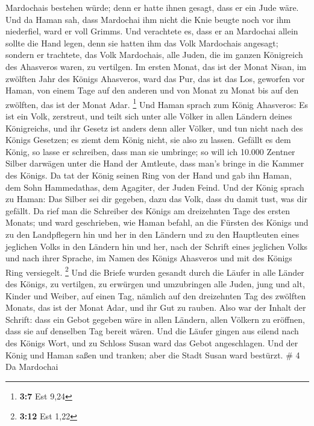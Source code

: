 Mardochais bestehen würde; denn er hatte ihnen gesagt, dass er ein Jude
wäre.  Und da Haman sah, dass Mardochai ihm nicht die Knie
beugte noch vor ihm niederfiel, ward er voll Grimms.  Und
verachtete es, dass er an Mardochai allein sollte die Hand legen, denn
sie hatten ihm das Volk Mardochais angesagt; sondern er trachtete, das
Volk Mardochais, alle Juden, die im ganzen Königreich des Ahasveros
waren, zu vertilgen.  Im ersten Monat, das ist der Monat
Nisan, im zwölften Jahr des Königs Ahasveros, ward das Pur, das ist das
Los, geworfen vor Haman, von einem Tage auf den anderen und von Monat zu
Monat bis auf den zwölften, das ist der Monat Adar. \footnote{\textbf{3:7}
  Est 9,24}  Und Haman sprach zum König Ahasveros: Es ist
ein Volk, zerstreut, und teilt sich unter alle Völker in allen Ländern
deines Königreichs, und ihr Gesetz ist anders denn aller Völker, und tun
nicht nach des Königs Gesetzen; es ziemt dem König nicht, sie also zu
lassen.  Gefällt es dem König, so lasse er schreiben, dass
man sie umbringe; so will ich 10.000 Zentner Silber darwägen unter die
Hand der Amtleute, dass man's bringe in die Kammer des Königs.
 Da tat der König seinen Ring von der Hand und gab ihn
Haman, dem Sohn Hammedathas, dem Agagiter, der Juden Feind.
 Und der König sprach zu Haman: Das Silber sei dir
gegeben, dazu das Volk, dass du damit tust, was dir gefällt.
 Da rief man die Schreiber des Königs am dreizehnten Tage
des ersten Monats; und ward geschrieben, wie Haman befahl, an die
Fürsten des Königs und zu den Landpflegern hin und her in den Ländern
und zu den Hauptleuten eines jeglichen Volks in den Ländern hin und her,
nach der Schrift eines jeglichen Volks und nach ihrer Sprache, im Namen
des Königs Ahasveros und mit des Königs Ring versiegelt. \footnote{\textbf{3:12}
  Est 1,22}  Und die Briefe wurden gesandt durch die
Läufer in alle Länder des Königs, zu vertilgen, zu erwürgen und
umzubringen alle Juden, jung und alt, Kinder und Weiber, auf einen Tag,
nämlich auf den dreizehnten Tag des zwölften Monats, das ist der Monat
Adar, und ihr Gut zu rauben.  Also war der Inhalt der
Schrift: dass ein Gebot gegeben wäre in allen Ländern, allen Völkern zu
eröffnen, dass sie auf denselben Tag bereit wären.  Und
die Läufer gingen aus eilend nach des Königs Wort, und zu Schloss Susan
ward das Gebot angeschlagen. Und der König und Haman saßen und tranken;
aber die Stadt Susan ward bestürzt. \# 4  Da Mardochai
